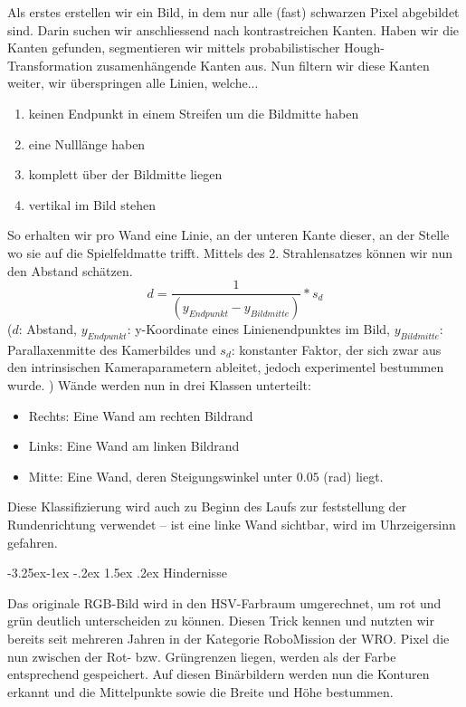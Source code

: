 \documentclass[a4paper]{scrarticle}
\makeatletter
\renewcommand\subsection{\@startsection{subsection}{2}{\z@}%
                                     {-3.25ex\@plus -1ex \@minus -.2ex}%
                                     {1.5ex \@plus .2ex}%
                                     {\Large\AKAfont}}
\makeatother
\begin{document}
Als erstes erstellen wir ein Bild, in dem nur alle (fast) schwarzen Pixel abgebildet sind. Darin suchen wir anschliessend nach kontrastreichen Kanten.
Haben wir die Kanten gefunden, segmentieren wir mittels probabilistischer Hough-Transformation zusamenhängende Kanten aus.
Nun filtern wir diese Kanten weiter, wir überspringen alle Linien, welche...
\begin{enumerate}
	\item {keinen Endpunkt in einem Streifen um die Bildmitte haben}
	\item {eine Nulllänge haben}
	\item {komplett über der Bildmitte liegen}
	\item {vertikal im Bild stehen}
\end{enumerate}
So erhalten wir pro Wand eine Linie, an der unteren Kante dieser, an der Stelle wo sie auf die Spielfeldmatte trifft.
Mittels des 2. Strahlensatzes können wir nun den Abstand schätzen.
$$
d = \frac{1}{(y_{Endpunkt}-y_{Bildmitte})} * s_d
$$
($d$: Abstand, $y_{Endpunkt}$: y-Koordinate eines Linienendpunktes im Bild, $y_{Bildmitte}$: Parallaxenmitte des Kamerbildes und $s_d$: konstanter Faktor, der sich zwar aus den intrinsischen Kameraparametern ableitet, jedoch experimentel bestummen wurde. )
\clearpage
Wände werden nun in drei Klassen unterteilt:
\begin{itemize}
	\item Rechts: Eine Wand am rechten Bildrand
	\item Links: Eine Wand am linken Bildrand
	\item Mitte: Eine Wand, deren Steigungswinkel unter $0.05$ (rad) liegt.
\end{itemize}
Diese Klassifizierung wird auch zu Beginn des Laufs zur feststellung der Rundenrichtung verwendet – ist eine linke Wand sichtbar, wird im Uhrzeigersinn gefahren.

\subsection{Hindernisse}

Das originale RGB-Bild wird in den HSV-Farbraum umgerechnet, um rot und grün deutlich unterscheiden zu können. Diesen Trick kennen und nutzten wir bereits seit mehreren Jahren in der Kategorie RoboMission der WRO.
Pixel die nun zwischen der Rot- bzw. Grüngrenzen liegen, werden als der Farbe entsprechend gespeichert. 
Auf diesen Binärbildern werden nun die Konturen erkannt und die Mittelpunkte sowie die Breite und Höhe bestummen.
\end{document}
